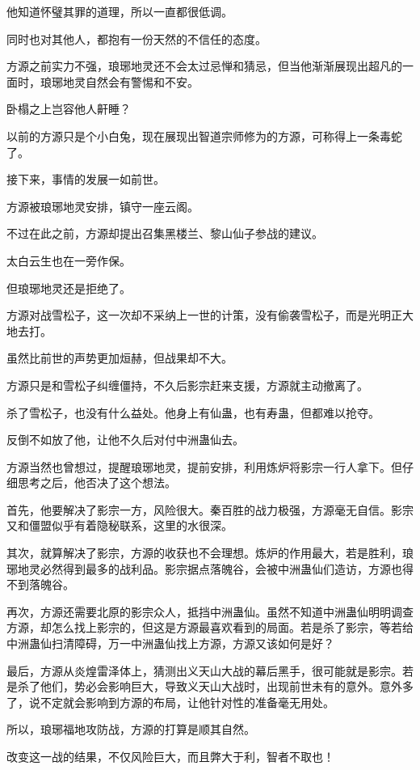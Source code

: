 \begin{this_body}
他知道怀璧其罪的道理，所以一直都很低调。

同时也对其他人，都抱有一份天然的不信任的态度。

方源之前实力不强，琅琊地灵还不会太过忌惮和猜忌，但当他渐渐展现出超凡的一面时，琅琊地灵自然会有警惕和不安。

卧榻之上岂容他人鼾睡？

以前的方源只是个小白兔，现在展现出智道宗师修为的方源，可称得上一条毒蛇了。

接下来，事情的发展一如前世。

方源被琅琊地灵安排，镇守一座云阁。

不过在此之前，方源却提出召集黑楼兰、黎山仙子参战的建议。

太白云生也在一旁作保。

但琅琊地灵还是拒绝了。

方源对战雪松子，这一次却不采纳上一世的计策，没有偷袭雪松子，而是光明正大地去打。

虽然比前世的声势更加烜赫，但战果却不大。

方源只是和雪松子纠缠僵持，不久后影宗赶来支援，方源就主动撤离了。

杀了雪松子，也没有什么益处。他身上有仙蛊，也有寿蛊，但都难以抢夺。

反倒不如放了他，让他不久后对付中洲蛊仙去。

方源当然也曾想过，提醒琅琊地灵，提前安排，利用炼炉将影宗一行人拿下。但仔细思考之后，他否决了这个想法。

首先，他要解决了影宗一方，风险很大。秦百胜的战力极强，方源毫无自信。影宗又和僵盟似乎有着隐秘联系，这里的水很深。

其次，就算解决了影宗，方源的收获也不会理想。炼炉的作用最大，若是胜利，琅琊地灵必然得到最多的战利品。影宗据点落魄谷，会被中洲蛊仙们造访，方源也得不到落魄谷。

再次，方源还需要北原的影宗众人，抵挡中洲蛊仙。虽然不知道中洲蛊仙明明调查方源，却怎么找上影宗的，但这是方源最喜欢看到的局面。若是杀了影宗，等若给中洲蛊仙扫清障碍，万一中洲蛊仙找上方源，方源又该如何是好？

最后，方源从炎煌雷泽体上，猜测出义天山大战的幕后黑手，很可能就是影宗。若是杀了他们，势必会影响巨大，导致义天山大战时，出现前世未有的意外。意外多了，说不定就会影响到方源的布局，让他针对性的准备毫无用处。

所以，琅琊福地攻防战，方源的打算是顺其自然。

改变这一战的结果，不仅风险巨大，而且弊大于利，智者不取也！

\end{this_body}

